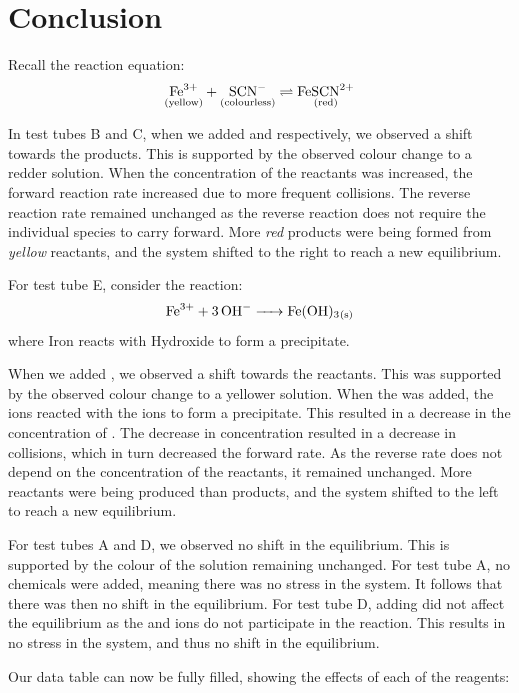 
\section{Conclusion}
Recall the reaction equation:
$$\rxn$$

In test tubes B and C, when we added  and  respectively, we observed a shift towards the products. This is supported by the observed colour change to a redder solution. When the concentration of the reactants was increased, the forward reaction rate increased due to more frequent collisions. The reverse reaction rate remained unchanged as the reverse reaction does not require the individual species to carry forward. More \textit{red} products were being formed from \textit{yellow} reactants, and the system shifted to the right to reach a new equilibrium.


For test tube E, consider the reaction:
$$\ce{Fe^3+ + 3OH- -> Fe(OH)3_{(s)}}$$
where Iron reacts with Hydroxide to form a precipitate.


When we added , we observed a shift towards the reactants. This was supported by the observed colour change to a yellower solution. When the  was added, the  ions reacted with the  ions to form a precipitate. This resulted in a decrease in the concentration of . The decrease in concentration resulted in a decrease in collisions, which in turn decreased the forward rate. As the reverse rate does not depend on the concentration of the reactants, it remained unchanged. More reactants were being produced than products, and the system shifted to the left to reach a new equilibrium.

For test tubes A and D, we observed no shift in the equilibrium. This is supported by the colour of the solution remaining unchanged. For test tube A, no chemicals were added, meaning there was no stress in the system. It follows that there was then no shift in the equilibrium. For test tube D, adding  did not affect the equilibrium as the  and  ions do not participate in the reaction. This results in no stress in the system, and thus no shift in the equilibrium.

Our data table can now be fully filled, showing the effects of each of the reagents:

